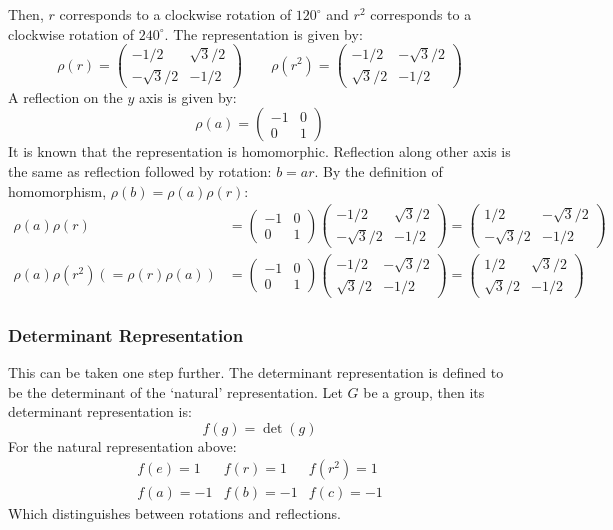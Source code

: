 \documentclass[12pt]{article}
\begin{document}
Then, $r$ corresponds to a clockwise rotation of $120^\circ$ and $r^2$ corresponds to a clockwise rotation of $240^\circ$. The representation is given by:
\[
\rho(r) = 
\begin{pmatrix}
-1/2 &{\sqrt3}/{2}\\
-{\sqrt3}/{2} & -1/2
\end{pmatrix}
\qquad
\rho(r^2) = 
\begin{pmatrix}
-1/2 &-{\sqrt3}/{2}\\
{\sqrt3}/{2} & -1/2
\end{pmatrix}
\]
A reflection on the $y$ axis is given by:
\[\rho(a) = 
\begin{pmatrix}
-1 & 0\\
0 & 1
\end{pmatrix}\]
It is known that the representation is homomorphic. Reflection along other axis is the same as reflection followed by rotation: $b = ar$. By the definition of homomorphism, $\rho(b)=\rho(a)\rho(r)$:
\begin{align*}
    \rho(a)\rho(r) &= 
\begin{pmatrix}
-1 & 0\\
0 & 1
\end{pmatrix}
\begin{pmatrix}
-1/2 &{\sqrt3}/{2}\\
-{\sqrt3}/{2} & -1/2
\end{pmatrix} 
=\begin{pmatrix}
1/2 &-{\sqrt3}/{2}\\
-{\sqrt3}/{2} & -1/2
\end{pmatrix}\\
\rho(a)\rho(r^2) (= \rho(r)\rho(a)) &=
\begin{pmatrix}
-1 & 0\\
0 & 1
\end{pmatrix}\begin{pmatrix}
-1/2 &-{\sqrt3}/{2}\\
{\sqrt3}/{2} & -1/2
\end{pmatrix}
=
\begin{pmatrix}
1/2 &{\sqrt3}/{2}\\
{\sqrt3}/{2} & -1/2
\end{pmatrix}
\end{align*}

\subsubsection{Determinant Representation}
This can be taken one step further. The determinant representation is defined to be the determinant of the `natural' representation. Let $G$ be a group, then its determinant representation is:
\[ f(g) = \det (g)\]
For the natural representation above:
\[
\begin{matrix}
f(e) = 1 & f(r) = 1 & f(r^2) = 1\\
f(a) = -1 & f(b) = -1 & f(c) = -1
\end{matrix}
\]
Which distinguishes between rotations and reflections.
\end{document}
